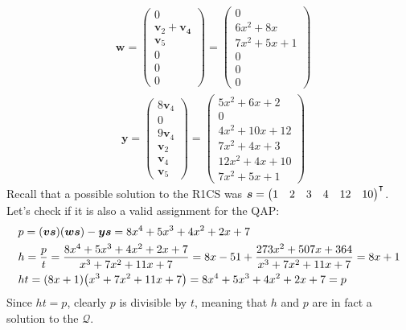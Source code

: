 \begin{example}
	\begin{align*}
		& \bm{w} =
		\begin{pmatrix}
			0 \\
			\bm{v}_2 + \bm{v_4} \\
			\bm{v}_5 \\
			0 \\ 
			0 \\ 
			0
		\end{pmatrix}
		= {\begin{pmatrix}
			   0             \\
			   6x^2 + 8x     \\
			   7x^2 + 5x + 1 \\
			   0             \\
			   0             \\
			   0
		   \end{pmatrix}}
	\end{align*}
	\begin{align*}
			& \bm{y} =
		\begin{pmatrix}
			8\bm{v}_4 \\
			0 \\
			9\bm{v}_4 \\
			\bm{v}_2 \\
			\bm{v}_4 \\
			\bm{v}_5
		\end{pmatrix}
		=
		{\begin{pmatrix}
			 5x^2 + 6x + 2   \\
			 0               \\
			 4x^2 + 10x + 12 \\
			 7x^2 + 4x + 3   \\
			 12x^2 + 4x + 10 \\
			 7x^2 + 5x + 1
		 \end{pmatrix}}
	\end{align*}
	Recall that a possible solution to the R1CS was
	\(\bm{s} = {\begin{pmatrix} 1 & 2 & 3 & 4 & 12 & 10 \end{pmatrix}}^{\transpose}\).
	Let's check if it is also a valid assignment for the QAP\@:
	\begin{align*}
		& p = \Parens*{\bm{v}\bm{s}}\Parens*{\bm{w}\bm{s}} - \bm{y}\bm{s} = 8x^4 + 5x^3 + 4x^2 + 2x + 7 \\
		& h = \frac{p}{t} = \frac{8x^4 + 5x^3 + 4x^2 + 2x + 7}{x^3 + 7x^2 + 11x + 7} =
			8x - 51 + \frac{273x^2 + 507x + 364}{x^3 + 7x^2 + 11x + 7} = 8x + 1 \\
		& ht = \Parens*{8x + 1}\Parens*{x^3 + 7x^2 + 11x + 7} = 8x^4 + 5x^3 + 4x^2 + 2x + 7 = p 
	\end{align*}
	Since \(ht = p\), clearly \(p\) is divisible by \(t\), meaning that \(h\) and \(p\) are in fact a
	solution to the \(\mathcal{Q}\).
\end{example}
